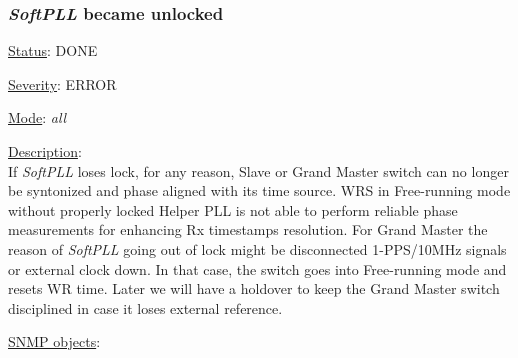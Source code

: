 \subsubsection{\bf \emph{SoftPLL} became unlocked}
		\label{fail:timing:spll_unlock}
		\begin{packed_enum}
			\item [] \underline{Status}: DONE
			\item [] \underline{Severity}: ERROR
			\item [] \underline{Mode}: \emph{all}
			\item [] \underline{Description}:\\
				If \emph{SoftPLL} loses lock, for any reason, Slave or Grand Master
				switch can no longer be syntonized and phase aligned with its time
				source. WRS in Free-running mode without properly locked Helper PLL is
				not able to perform reliable phase measurements for enhancing Rx
				timestamps resolution. For Grand Master the reason of \emph{SoftPLL}
				going out of lock might be disconnected 1-PPS/10MHz signals or external
				clock down. In that case, the switch goes into Free-running mode and
				resets WR time. Later we will have a holdover to keep the Grand Master
				switch disciplined in case it loses external reference.
			\item [] \underline{SNMP objects}:\\
				\\
				\\
				\\
				\\
				\\
				\\
		\end{packed_enum}


